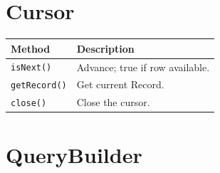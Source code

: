 \section{Cursor}
\label{sec:api-cursor}

\begin{longtable}{P{4.8cm}P{5.7cm}}
\toprule
\textbf{Method} & \textbf{Description} \\
\midrule
\endhead
\texttt{isNext()} & Advance; true if row available. \\
\texttt{getRecord()} & Get current Record. \\
\texttt{close()} & Close the cursor. \\
\bottomrule
\end{longtable}

\section{QueryBuilder}
\label{sec:api-querybuilder}

